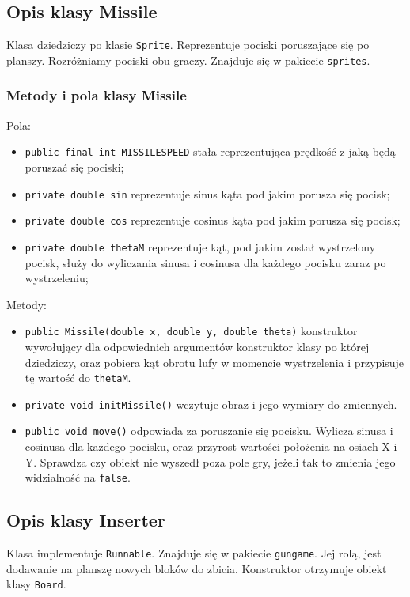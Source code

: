 \documentclass[12pt]{report}
\newcommand{\code}[1]{\texttt{#1}}
\begin{document}
\subsection{Opis klasy Missile}
Klasa dziedziczy po klasie \code{Sprite}. Reprezentuje pociski poruszające się po planszy. Rozróżniamy pociski obu graczy. Znajduje się w pakiecie \code{sprites}.
\subsubsection{Metody i pola klasy Missile}
Pola:
\begin{itemize}
    \item \code{public final int MISSILESPEED} stała reprezentująca prędkość z jaką będą poruszać się pociski;
    \item \code{private double sin} reprezentuje sinus kąta pod jakim porusza się pocisk;
    \item \code{private double cos} reprezentuje cosinus kąta pod jakim porusza się pocisk;
    \item \code{private double thetaM} reprezentuje kąt, pod jakim został wystrzelony pocisk, służy do wyliczania sinusa i cosinusa dla każdego pocisku zaraz po wystrzeleniu;
\end{itemize}
Metody:
\begin{itemize}
    \item \code{public Missile(double x, double y, double theta)} konstruktor wywołujący dla odpowiednich argumentów konstruktor klasy po której dziedziczy, oraz pobiera kąt obrotu lufy w momencie wystrzelenia i przypisuje tę wartość do \code{thetaM}.
    \item \code{private void initMissile()} wczytuje obraz i jego wymiary do zmiennych.  
    \item \code{public void move()} odpowiada za poruszanie się pocisku. Wylicza sinusa i cosinusa dla każdego pocisku, oraz przyrost wartości położenia na osiach X i Y. Sprawdza czy obiekt nie wyszedł poza pole gry, jeżeli tak to zmienia jego widzialność na \code{false}.
\end{itemize}



\subsection{Opis klasy Inserter}
Klasa implementuje \code{Runnable}. Znajduje się w pakiecie \code{gungame}. Jej rolą, jest dodawanie na planszę nowych bloków do zbicia. Konstruktor otrzymuje obiekt klasy \code{Board}.
\end{document}
